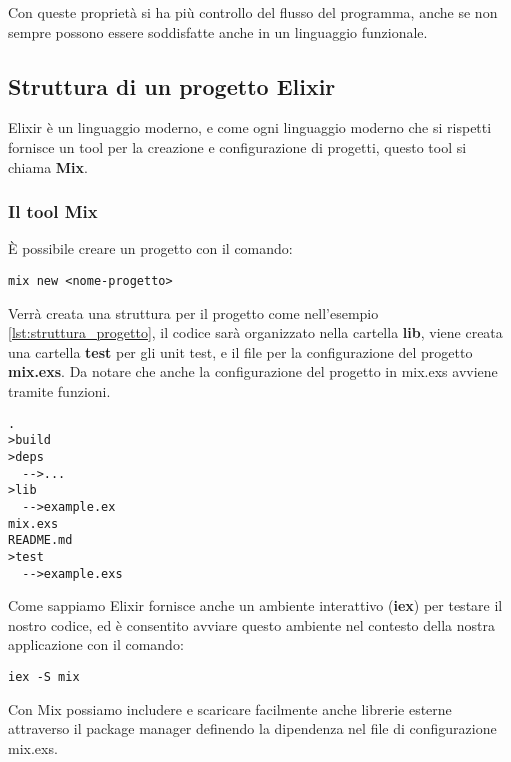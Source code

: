 Con queste proprietà si ha più controllo del flusso del programma,
anche se non sempre possono essere soddisfatte anche in un linguaggio
funzionale.


\subsection{Struttura di un progetto Elixir}

Elixir è un linguaggio moderno, e come ogni linguaggio moderno che
si rispetti fornisce un tool per la creazione e configurazione di
progetti, questo tool si chiama \textbf{Mix}.


\subsubsection{Il tool Mix}
È possibile creare un progetto con il comando:

\begin{lstlisting}[language=none]
mix new <nome-progetto>
\end{lstlisting}

Verrà creata una struttura per il progetto come nell'esempio \ref{lst:struttura_progetto},
il codice sarà organizzato nella cartella \textbf{lib}, viene creata una
cartella \textbf{test} per gli unit test, e il file per
la configurazione del progetto \textbf{mix.exs}.
Da notare che anche la configurazione del progetto in mix.exs
avviene tramite funzioni.

\newpage

\begin{lstlisting}[language=none,captionpos=b,caption={Struttura progetto},label={lst:struttura_progetto}]
.
>build
>deps
  -->...
>lib
  -->example.ex
mix.exs
README.md
>test
  -->example.exs
\end{lstlisting}

Come sappiamo Elixir fornisce anche un ambiente interattivo (\textbf{iex}) per
testare il nostro codice, ed è consentito avviare questo ambiente nel
contesto della nostra applicazione con il comando:

\begin{lstlisting}[language=none]
iex -S mix 
\end{lstlisting}


Con Mix possiamo includere e scaricare facilmente
anche librerie esterne attraverso
il package manager definendo la dipendenza nel file di configurazione
mix.exs.\cite{HexDocs99:online}

